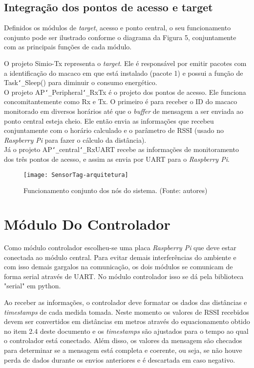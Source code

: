 \subsection{Integração dos pontos de acesso e target}

Definidos os módulos de \emph{target}, acesso e ponto central, o seu funcionamento conjunto pode ser ilustrado conforme o diagrama da Figura 5, conjuntamente com as principais funções de cada módulo.

O projeto Simio-Tx representa o \emph{target}. Ele é responsável por emitir pacotes com a identificação do macaco em que está instalado (pacote 1) e possui a função de Task\texttt{\char`_}Sleep() para diminuir o consumo energético. \\
O projeto AP\texttt{\char`_}Peripheral\texttt{\char`_}RxTx é o projeto dos pontos de acesso. Ele funciona concomitantemente como Rx e Tx. O primeiro é para receber o ID do macaco monitorado em diversos horários até que o \emph{buffer} de mensagem a ser enviada ao ponto central esteja cheio. Ele então envia as informações que recebeu conjuntamente com o horário calculado e o parâmetro de RSSI (usado no \emph{Raspberry Pi} para fazer o cálculo da distância). \\
Já o projeto AP\texttt{\char`_}central\texttt{\char`_}RxUART recebe as informações de monitoramento dos três pontos de acesso, e assim as envia por UART para o \emph{Raspberry Pi}. \\

\begin{figure}[ht]
  \centering
    \texttt{[image: SensorTag-arquitetura]}
  \caption{ Funcionamento conjunto dos nós do sistema. (Fonte: autores)}
\end{figure}
\FloatBarrier

\section{Módulo Do Controlador}

Como módulo controlador escolheu-se uma placa \emph{Raspberry Pi} que deve estar conectada ao módulo central. Para evitar demais interferências do ambiente e com isso demais gargalos na comunicação, os dois módulos se comunicam de forma serial através de UART. No módulo controlador isso se dá pela biblioteca "serial" em python.

Ao receber as informações, o controlador deve formatar os dados das distâncias e \emph{timestamps} de cada medida tomada. Neste momento os valores de RSSI recebidos devem ser convertidos em distâncias em metros através do equacionamento obtido no item 2.4 deste documento e os \emph{timestamps} são ajustados para o tempo ao qual o controlador está conectado. Além disso, os valores da mensagem são checados para determinar se a mensagem está completa e coerente, ou seja, se não houve perda de dados durante os envios anteriores e é descartada em caso negativo.

